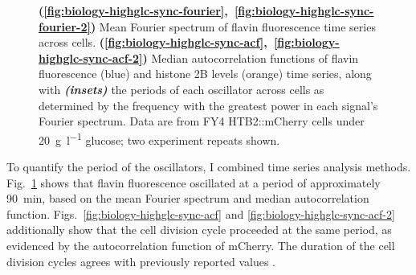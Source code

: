 \begin{figure}
  \caption[
    Mean Fourier spectrum of flavin fluorescence time series across cells.
    Median autocorrelation functions of flavin fluorescence and histone 2B levels time series, along with the periods of each oscillator across cells.
    Data are from FY4 HTB2::mCherry cells under \SI{20}{\gram~\litre^{-1}} glucose.
  ]{
    \textbf{(\ref{fig:biology-highglc-sync-fourier},~\ref{fig:biology-highglc-sync-fourier-2})} Mean Fourier spectrum of flavin fluorescence time series across cells. \textbf{(\ref{fig:biology-highglc-sync-acf},~\ref{fig:biology-highglc-sync-acf-2})} Median autocorrelation functions of flavin fluorescence (blue) and histone 2B levels (orange) time series, along with \textit{\textbf{(insets)}} the periods of each oscillator across cells as determined by the frequency with the greatest power in each signal's Fourier spectrum.
    Data are from FY4 HTB2::mCherry cells under \SI{20}{\gram~\litre^{-1}} glucose; two experiment repeats shown.
  }
  \label{fig:biology-highglc-sync-spectral}
\end{figure}

To quantify the period of the oscillators, I combined time series analysis methods.
Fig.\ \ref{fig:biology-highglc-sync-spectral} shows that flavin fluorescence oscillated at a period of approximately \SI{90}{\minute}, based on the mean Fourier spectrum and median autocorrelation function.
Figs.\ \ref{fig:biology-highglc-sync-acf} and \ref{fig:biology-highglc-sync-acf-2} additionally show that the cell division cycle proceeded at the same period, as evidenced by the autocorrelation function of mCherry.
The duration of the cell division cycles agrees with previously reported values \parencite{herskowitzLifeCycleBudding1988}.


